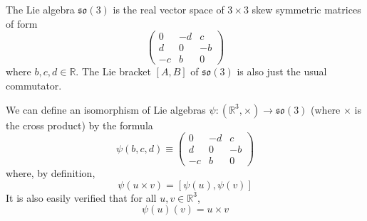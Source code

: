 \documentclass{article}
\begin{document}
      \begin{example}
        The Lie algebra $\mathfrak{so}(3)$ is the real vector space of $3 \times 3$ skew symmetric matrices of form 
        \begin{equation}
          \begin{pmatrix}
          0 & -d & c \\ d & 0 & -b \\ -c & b & 0
          \end{pmatrix}
        \end{equation}
        where $b, c, d \in \mathbb{R}$. The Lie bracket $[A,B]$ of $\mathfrak{so}(3)$ is also just the usual commutator. 

        We can define an isomorphism of Lie algebras $\psi: (\mathbb{R}^3, \times) \longrightarrow \mathfrak{so}(3)$ (where $\times$ is the cross product) by the formula 
        \begin{equation}
          \psi(b, c, d) \equiv \begin{pmatrix}
          0 & -d & c \\
          d & 0 & -b \\
          -c & b & 0
          \end{pmatrix}
        \end{equation}
        where, by definition, 
        \begin{equation}
          \psi(u \times v) = [\psi(u), \psi(v)]
        \end{equation}
        It is also easily verified that for all $u, v \in \mathbb{R}^3$, 
        \begin{equation}
          \psi(u) (v) = u \times v
        \end{equation}
      \end{example}
\end{document}
